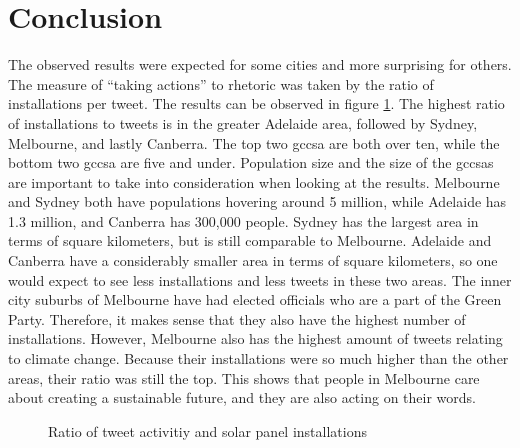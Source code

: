 \documentclass[11pt, oneside]{article}
\begin{document}
\section{Conclusion}
\label{sec:conclusion}
The observed results were expected for some cities and more surprising for others. The measure of \enquote{taking actions} to rhetoric was taken by the ratio of installations per tweet. The results can be observed in figure \ref{fig:ratio_tweet_activity_solar_panels}. The highest ratio of installations to tweets is in the greater Adelaide area, followed by Sydney, Melbourne, and lastly Canberra. The top two \acrlong{gccsa} are both over ten, while the bottom two \acrlong{gccsa} are five and under. 
\newline
\newline
Population size and the size of the \acrlong{gccsa}s are important to take into consideration when looking at the results. Melbourne and Sydney both have populations hovering around 5 million, while Adelaide has 1.3 million, and Canberra has 300,000 people. Sydney has the largest area in terms of square kilometers, but is still comparable to Melbourne. Adelaide and Canberra have a considerably smaller area in terms of square kilometers, so one would expect to see less installations and less tweets in these two areas. 
\newline
\newline
The inner city suburbs of Melbourne have had elected officials who are a part of the Green Party. Therefore, it makes sense that they also have the highest number of installations. However, Melbourne also has the highest amount of tweets relating to climate change. Because their installations were so much higher than the other areas, their ratio was still the top. This shows that people in Melbourne care about creating a sustainable future, and they are also acting on their words.
\begin{figure}
  \begin{center}
  \end{center}
  \caption{Ratio of tweet activitiy and solar panel installations}
  \label{fig:ratio_tweet_activity_solar_panels}
\end{figure}
\end{document}
